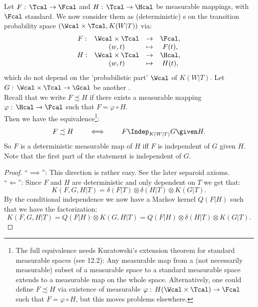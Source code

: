 \begin{Lem}
    Let $F:\, \Tcal \to \Fcal$ and $H:\,\Tcal \to \Hcal$ be measurable mappings, with $\Fcal$ standard.
    We now consider them as (deterministic) \trv{}s on the transition probability space $(\Wcal \times \Tcal,K(W|T))$ via:
    \[\begin{array}{ccccc} 
        F: & \Wcal  \times \Tcal &\to &\Fcal,\\
           &(w,t) &\mapsto& F(t), \\
        H: & \Wcal  \times \Tcal &\to &\Hcal,\\
           &(w,t) &\mapsto& H(t), \\
    \end{array}\]
    which do not depend on the 'probabilistic part' $\Wcal$ of $K(W|T)$. Let $G:\, \Wcal \times \Tcal \to \Gcal$ be another \trv{}.\\
    Recall that we write $F \precsim H$ if there exists a measurable mapping $\varphi:\,\Hcal \to \Fcal$ such that $F = \varphi \circ H$.\\
    Then we have the equivalence\footnote{The full equivalence needs Kuratowski's extension theorem for standard measurable spaces
    (see \cite{Kec95} 12.2): Any measurable map from a (not necessarily measurable) subset of a measurable space to a standard measurable space extends to a measurable map on the whole space. Alternatively, one could define $F \precsim H$ via existence of measurable $\varphi:\, H(\Wcal \times \Tcal) \to \Fcal$ such that $F=\varphi \circ H$, but this moves problems elsewhere.}:
    \[ F \precsim H \qquad \iff\qquad F \Indep_{K(W|T)} G \given H.\]
    So $F$ is a deterministic measurable map of $H$ iff $F$ is independent of $G$ given $H$. Note that the first part of the statement is independent of $G$.%
\begin{proof}
 ``$\implies$'': This direction is rather easy. See the later separoid axioms.\\
 ``$\Longleftarrow$'': Since $F$ and $H$ are deterministic and only dependent on $T$ we get that:
    \[ K(F,G,H|T) = \delta(F|T) \otimes \delta(H|T) \otimes K(G|T).  \]
    By the conditional independence we now have a Markov kernel $Q(F|H)$ such that we have the factorization:
    \[ K(F,G,H|T) = Q(F|H) \otimes K(G,H|T) = Q(F|H) \otimes \delta(H|T) \otimes K(G|T).  \]

\end{proof}
\end{Lem}
